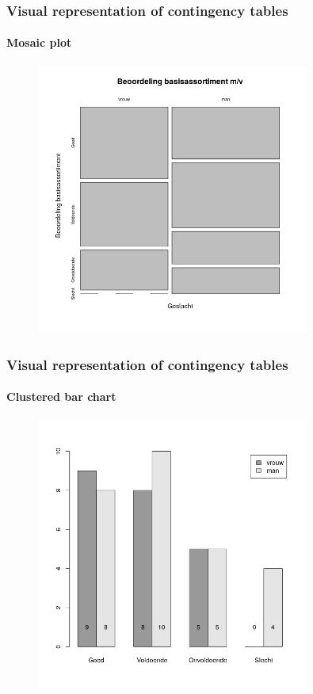 \documentclass{beamer}
\begin{document}
\begin{frame}
  \frametitle{Visual representation of contingency tables}
  \framesubtitle{Mosaic plot}
  
  \begin{figure}
    \centering
    \includegraphics[width=0.80\textwidth]{img/2var-xtab-plot-waardering}
  \end{figure}
  
\end{frame}

\begin{frame}
  \frametitle{Visual representation of contingency tables}
  \framesubtitle{Clustered bar chart}

  \begin{figure}
    \centering
    \includegraphics[width=0.80\textwidth]{img/2var-staafgrafiek-geclusterd}
  \end{figure}

\end{frame}
\end{document}
